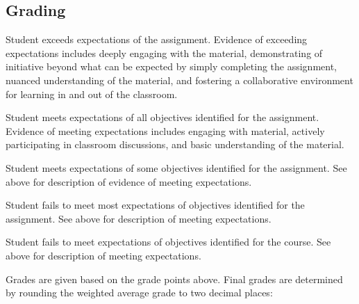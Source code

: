 \subsection{Grading}
\begin{description}
\tightlist
\item[A (4.0)] Student exceeds expectations of the assignment. Evidence of exceeding expectations includes deeply engaging with the material, demonstrating of initiative beyond what can be expected by simply completing the assignment, nuanced understanding of the material, and fostering a collaborative environment for learning in and out of the classroom.
\item[B (3.0)] Student meets expectations of all objectives identified for the assignment. Evidence of meeting expectations includes engaging with material, actively participating in classroom discussions, and basic understanding of the material.
\item[C (2.0)] Student meets expectations of some objectives identified for the assignment. See above for description of evidence of meeting expectations.
\item[D (1.0)] Student fails to meet most expectations of objectives identified for the assignment. See above for description of meeting expectations.
\item[F (0.0)] Student fails to meet expectations of objectives identified for the course. See above for description of meeting expectations.
\end{description}

\noindent Grades are given based on the grade points above. Final grades are determined by rounding the weighted average grade to two decimal places:

